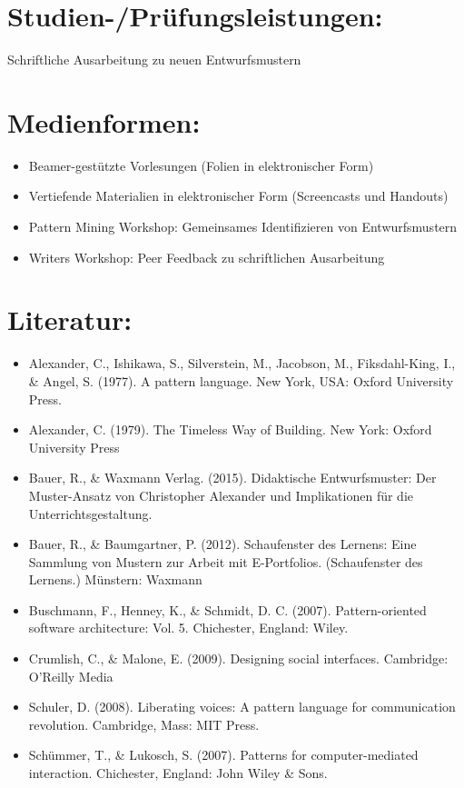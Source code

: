 \section*{Studien-/Prüfungsleistungen:}\label{studien-pruxfcfungsleistungen-18}

Schriftliche Ausarbeitung zu neuen Entwurfsmustern

\section*{Medienformen:}\label{medienformen-18}

\begin{itemize}
\item
  Beamer-gestützte Vorlesungen (Folien in elektronischer Form)
\item
  Vertiefende Materialien in elektronischer Form (Screencasts und
  Handouts)
\item
  Pattern Mining Workshop: Gemeinsames Identifizieren von
  Entwurfsmustern
\item
  Writers Workshop: Peer Feedback zu schriftlichen Ausarbeitung
\end{itemize}

\section*{Literatur:}\label{literatur-15}

\begin{itemize}
\item
  Alexander, C., Ishikawa, S., Silverstein, M., Jacobson, M.,
  Fiksdahl-King, I., \& Angel, S. (1977). A pattern language. New York,
  USA: Oxford University Press.
\item
  Alexander, C. (1979). The Timeless Way of Building. New York: Oxford
  University Press
\item
  Bauer, R., \& Waxmann Verlag. (2015). Didaktische Entwurfsmuster: Der
  Muster-Ansatz von Christopher Alexander und Implikationen für die
  Unterrichtsgestaltung.
\item
  Bauer, R., \& Baumgartner, P. (2012). Schaufenster des Lernens: Eine
  Sammlung von Mustern zur Arbeit mit E-Portfolios. (Schaufenster des
  Lernens.) Münstern: Waxmann
\item
  Buschmann, F., Henney, K., \& Schmidt, D. C. (2007). Pattern-oriented
  software architecture: Vol. 5. Chichester, England: Wiley.
\item
  Crumlish, C., \& Malone, E. (2009). Designing social interfaces.
  Cambridge: O'Reilly Media
\item
  Schuler, D. (2008). Liberating voices: A pattern language for
  communication revolution. Cambridge, Mass: MIT Press.
\item
  Schümmer, T., \& Lukosch, S. (2007). Patterns for computer-mediated
  interaction. Chichester, England: John Wiley \& Sons.
\end{itemize}

